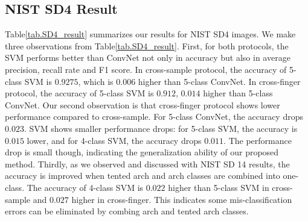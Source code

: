 \subsection{NIST SD4 Result}
\label{sec_sd4}
 Table\ref{tab.SD4_result} summarizes our results for NIST SD4 images.
%
We make three observations from Table\ref{tab.SD4_result}.
%
First, for both protocols, the SVM performs better than ConvNet not only in accuracy but also in average precision, recall rate and F1 score. 
%
In cross-sample protocol, the accuracy of 5-class SVM is $0.9275$, which is $0.006$ higher than 5-class ConvNet. In cross-finger protocol, the accuracy of 5-class SVM is $0.912$, $0.014$ higher than 5-class ConvNet.
%
Our second observation is that cross-finger protocol shows lower performance compared to cross-sample. For 5-class ConvNet, the accuracy drops $0.023$. SVM shows smaller performance drops: for 5-class SVM, the accuracy is $0.015$ lower, and for 4-class SVM, the accuracy drops $0.011$. 
%
%
The performance drop is small though, indicating the generalization ability of our proposed method.
%
Thirdly, as we observed and discussed with NIST SD 14 results, the accuracy is improved when tented arch and arch classes are combined into one-class. The accuracy of 4-class SVM is $0.022$ higher than 5-class SVM in cross-sample and $0.027$ higher in cross-finger. This indicates some mis-classification errors can be eliminated by combing arch and tented arch classes.

